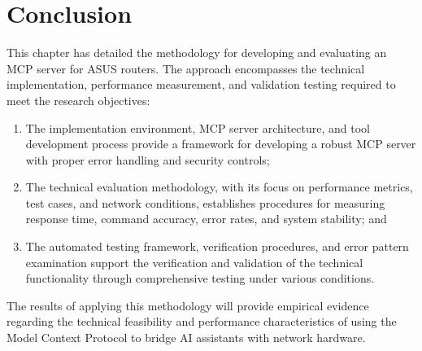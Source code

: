 \section{Conclusion}
This chapter has detailed the methodology for developing and evaluating an MCP server for ASUS routers. The approach encompasses the technical implementation, performance measurement, and validation testing required to meet the research objectives:
\begin{enumerate}
\item The implementation environment, MCP server architecture, and tool development process provide a framework for developing a robust MCP server with proper error handling and security controls;
\item The technical evaluation methodology, with its focus on performance metrics, test cases, and network conditions, establishes procedures for measuring response time, command accuracy, error rates, and system stability; and
\item The automated testing framework, verification procedures, and error pattern examination support the verification and validation of the technical functionality through comprehensive testing under various conditions.
\end{enumerate}
The results of applying this methodology will provide empirical evidence regarding the technical feasibility and performance characteristics of using the Model Context Protocol to bridge AI assistants with network hardware.